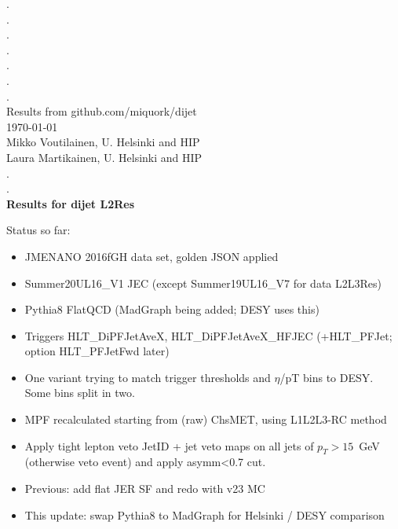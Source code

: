 \documentclass[landscape,10pt]{beamer} %
\begin{document}
\begin{centering}
{. }\\
{. }\\
{. }\\
{. }\\
{. }\\
{. }\\
{. }\\
Results from github.com/miquork/dijet \\
\today\\
Mikko Voutilainen, U. Helsinki and HIP\\
Laura Martikainen, U. Helsinki and HIP\\
{. }\\
{. }\\
{\bf Results for dijet L2Res}\\
\end{centering}

\newpage

Status so far:
\begin{itemize}
\item JMENANO 2016fGH data set, golden JSON applied
\item Summer20UL16\_V1 JEC (except Summer19UL16\_V7 for data L2L3Res)
\item Pythia8 FlatQCD (MadGraph being added; DESY uses this) 
\item Triggers HLT\_DiPFJetAveX, HLT\_DiPFJetAveX\_HFJEC (+HLT\_PFJet; option HLT\_PFJetFwd later)
\item One variant trying to match trigger thresholds and $\eta$/pT bins to DESY. Some bins split in two.
\item MPF recalculated starting from (raw) ChsMET, using L1L2L3-RC method
\item Apply tight lepton veto JetID + jet veto maps on all jets of $p_T>15$~GeV (otherwise veto event) and apply asymm<0.7 cut.
\item Previous: add flat JER SF and redo with v23 MC
\item This update: swap Pythia8 to MadGraph for Helsinki / DESY comparison
\end{itemize}
\end{document}
